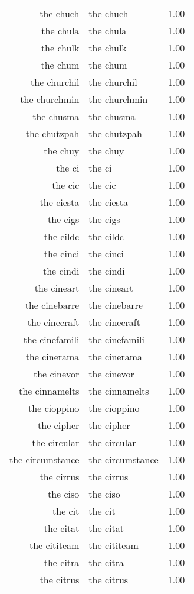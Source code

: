 \begin{table}[ht]
\begin{tabular}{rlr}
  the chuch & the chuch & 1.00 \\ 
  the chula & the chula & 1.00 \\ 
  the chulk & the chulk & 1.00 \\ 
  the chum & the chum & 1.00 \\ 
  the churchil & the churchil & 1.00 \\ 
  the churchmin & the churchmin & 1.00 \\ 
  the chusma & the chusma & 1.00 \\ 
  the chutzpah & the chutzpah & 1.00 \\ 
  the chuy & the chuy & 1.00 \\ 
  the ci & the ci & 1.00 \\ 
  the cic & the cic & 1.00 \\ 
  the ciesta & the ciesta & 1.00 \\ 
  the cigs & the cigs & 1.00 \\ 
  the cildc & the cildc & 1.00 \\ 
  the cinci & the cinci & 1.00 \\ 
  the cindi & the cindi & 1.00 \\ 
  the cineart & the cineart & 1.00 \\ 
  the cinebarre & the cinebarre & 1.00 \\ 
  the cinecraft & the cinecraft & 1.00 \\ 
  the cinefamili & the cinefamili & 1.00 \\ 
  the cinerama & the cinerama & 1.00 \\ 
  the cinevor & the cinevor & 1.00 \\ 
  the cinnamelts & the cinnamelts & 1.00 \\ 
  the cioppino & the cioppino & 1.00 \\ 
  the cipher & the cipher & 1.00 \\ 
  the circular & the circular & 1.00 \\ 
  the circumstance & the circumstance & 1.00 \\ 
  the cirrus & the cirrus & 1.00 \\ 
  the ciso & the ciso & 1.00 \\ 
  the cit & the cit & 1.00 \\ 
  the citat & the citat & 1.00 \\ 
  the cititeam & the cititeam & 1.00 \\ 
  the citra & the citra & 1.00 \\ 
  the citrus & the citrus & 1.00 \\ 

\end{tabular}
\end{table}
